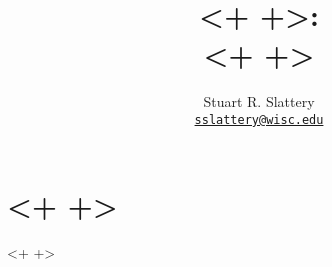 \documentclass[letterpaper]{article}
\author{Stuart R. Slattery
\\ \href{mailto:sslattery@wisc.edu}{\texttt{sslattery@wisc.edu}}
}
\date{}
\title{<+  +>:\\
<+  +>}
\begin{document}
\maketitle
\section{<+  +>}<+  +>

\pagebreak


\end{document}
